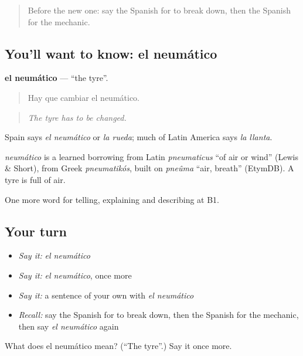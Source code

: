 \begin{quote}
Before the new one: say the Spanish for to break down, then the Spanish for the mechanic.
\end{quote}

\subsection*{You'll want to know: el neumático}
\textbf{el neumático} — \textquotedblleft{}the tyre\textquotedblright{}.

\begin{quote}
Hay que cambiar el neumático.
\end{quote}

\begin{quote}
\emph{The tyre has to be changed.}
\end{quote}

Spain says \emph{el neumático} or \emph{la rueda}; much of Latin America says \emph{la llanta}.

\begin{cousinweb}
\emph{neumático} is a learned borrowing from Latin \emph{pneumaticus} \textquotedblleft{}of air or wind\textquotedblright{} (Lewis \& Short), from Greek \emph{pneumatikós}, built on \emph{pneûma} \textquotedblleft{}air, breath\textquotedblright{} (EtymDB). A tyre is full of air.
\end{cousinweb}

\begin{grammarlens}[title={What you've built}]
One more word for telling, explaining and describing at B1.
\end{grammarlens}

\subsection*{Your turn}
\begin{itemize}
\raggedright
  \item \emph{Say it:} \emph{el neumático}
  \item \emph{Say it:} \emph{el neumático}, once more
  \item \emph{Say it:} a sentence of your own with \emph{el neumático}
  \item \emph{Recall:} say the Spanish for to break down, then the Spanish for the mechanic, then say \emph{el neumático} again
\end{itemize}

\begin{tcolorbox}[breakable,colback=teal!4,colframe=teal!35!black,title={Before you move on}]
What does el neumático mean? (\textquotedblleft{}The tyre\textquotedblright{}.) Say it once more.
\end{tcolorbox}
